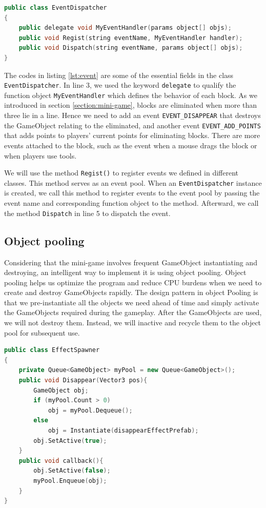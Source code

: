 \documentclass[msc,deptreport,ai]{infthesis}      %
\begin{document}
\begin{lstlisting}[caption=Event dispatcher,label={lst:event},language=C++]
public class EventDispatcher
{
    public delegate void MyEventHandler(params object[] objs);
    public void Regist(string eventName, MyEventHandler handler);
    public void Dispatch(string eventName, params object[] objs);
}
\end{lstlisting}

The codes in listing \ref{lst:event} are some of the essential fields in the class \texttt{EventDispatcher}. In line 3, we used the keyword \texttt{delegate} to qualify the function object \texttt{MyEventHandler} which defines the behavior of each block. As we introduced in section \ref{section:mini-game}, blocks are eliminated when more than three lie in a line. Hence we need to add an event \texttt{EVENT\_DISAPPEAR} that destroys the GameObject relating to the eliminated, and another event \texttt{EVENT\_ADD\_POINTS} that adds points to players' current points for eliminating blocks. There are more events attached to the block, such as the event when a mouse drags the block or when players use tools.

We will use the method \texttt{Regist()} to register events we defined in different classes. This method serves as an event pool. When an \texttt{EventDispatcher} instance is created, we call this method to register events to the event pool by passing the event name and corresponding function object to the method. Afterward, we call the method \texttt{Dispatch} in line 5 to dispatch the event.

\subsection{Object pooling}

Considering that the mini-game involves frequent GameObject instantiating and destroying, an intelligent way to implement it is using object pooling. Object pooling helps us optimize the program and reduce CPU burdens when we need to create and destroy GameObjects rapidly. The design pattern in object Pooling is that we pre-instantiate all the objects we need ahead of time and simply activate the GameObjects required during the gameplay. After the GameObjects are used, we will not destroy them. Instead, we will inactive and recycle them to the object pool for subsequent use.

\begin{lstlisting}[caption=Object pooling,label={lst:pooling},language=C++]
public class EffectSpawner
{
    private Queue<GameObject> myPool = new Queue<GameObject>();
    public void Disappear(Vector3 pos){
        GameObject obj;
        if (myPool.Count > 0)
            obj = myPool.Dequeue();
        else
            obj = Instantiate(disappearEffectPrefab);
        obj.SetActive(true);
    }
    public void callback(){
        obj.SetActive(false);
        myPool.Enqueue(obj);
    }
}
\end{lstlisting}
\end{document}
